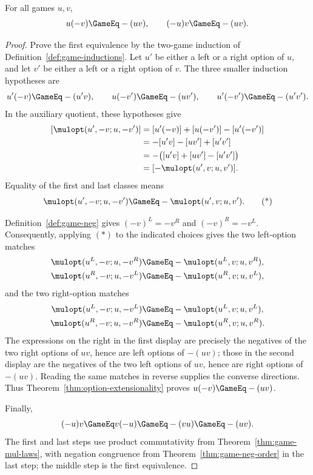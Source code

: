\begin{lemma}
  \label{lem:game-mul-neg}
  \leanok
  For all games \(u,v\),
  \[
    u(-v)\GameEq-(uv),
    \qquad
    (-u)v\GameEq-(uv).
  \]
\end{lemma}
\begin{proof}
  \leanok
  Prove the first equivalence by the two-game induction of
  Definition~\ref{def:game-inductions}.  Let \(u'\) be either a left or a
  right option of \(u\), and let \(v'\) be either a left or a right option of
  \(v\).  The three smaller induction hypotheses are
  \[
    u'(-v)\GameEq-(u'v),\qquad
    u(-v')\GameEq-(uv'),\qquad
    u'(-v')\GameEq-(u'v').
  \]
  In the auxiliary quotient, these hypotheses give
  \[
    \begin{aligned}
      [\mulopt(u',-v;u,-v')]
        &=[u'(-v)]+[u(-v')]-[u'(-v')]\\
        &=-[u'v]-[uv']+[u'v']\\
        &=-\bigl([u'v]+[uv']-[u'v']\bigr)\\
        &=[-\mulopt(u',v;u,v')].
    \end{aligned}
  \]
  Equality of the first and last classes means
  \[
    \mulopt(u',-v;u,-v')
      \GameEq-\mulopt(u',v;u,v').
    \tag{*}
  \]

  Definition~\ref{def:game-neg} gives
  \(({-v})^L=-v^R\) and \(({-v})^R=-v^L\).  Consequently, applying \((*)\)
  to the indicated choices gives the two left-option matches
  \[
    \begin{aligned}
      \mulopt(u^L,-v;u,-v^R)
        &\GameEq-\mulopt(u^L,v;u,v^R),\\
      \mulopt(u^R,-v;u,-v^L)
        &\GameEq-\mulopt(u^R,v;u,v^L),
    \end{aligned}
  \]
  and the two right-option matches
  \[
    \begin{aligned}
      \mulopt(u^L,-v;u,-v^L)
        &\GameEq-\mulopt(u^L,v;u,v^L),\\
      \mulopt(u^R,-v;u,-v^R)
        &\GameEq-\mulopt(u^R,v;u,v^R).
    \end{aligned}
  \]
  The expressions on the right in the first display are precisely the
  negatives of the two right options of \(uv\), hence are left options of
  \(-(uv)\); those in the second display are the negatives of the two left
  options of \(uv\), hence are right options of \(-(uv)\).  Reading the same
  matches in reverse supplies the converse directions.  Thus
  Theorem~\ref{thm:option-extensionality} proves
  \(u(-v)\GameEq-(uv)\).

  Finally,
  \[
    (-u)v
      \GameEq v(-u)
      \GameEq-(vu)
      \GameEq-(uv).
  \]
  The first and last steps use product commutativity from
  Theorem~\ref{thm:game-mul-laws}, with negation congruence from
  Theorem~\ref{thm:game-neg-order} in the last step; the middle step is the
  first equivalence.
\end{proof}

